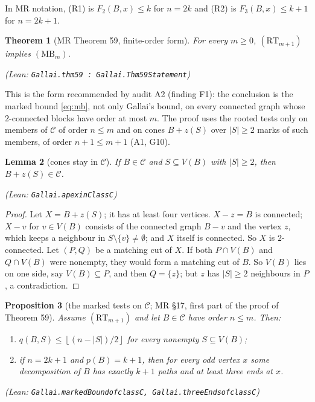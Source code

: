 \documentclass[11pt]{amsart}
\newtheorem{theorem}{Theorem}[section]
\newtheorem{lemma}[theorem]{Lemma}
\newtheorem{proposition}[theorem]{Proposition}
\theoremstyle{definition}
\theoremstyle{remark}
\renewcommand{\_}{\oldunderscore\allowbreak}
\newcommand{\leanst}[1]{\par{\raggedright\small\textup{(Lean: \texttt{#1})}\par}}
\newcommand{\cC}{\mathcal{C}}
\newcommand{\fl}[1]{\left\lfloor #1\right\rfloor}
\newcommand{\MBU}{\mathrm{MB}}
\newcommand{\RT}{\mathrm{RT}}
\begin{document}
In MR notation, (R1) is $F_2(B,x)\le k$ for $n=2k$ and (R2) is $F_3(B,x)\le k+1$ for $n=2k+1$.

\begin{theorem}[MR Theorem 59, finite-order form]\label{thm:59}
For every $m\ge0$, $(\RT_{m+1})$ implies $(\MBU_m)$.
\leanst{Gallai.thm59 : Gallai.Thm59Statement}
\end{theorem}

This is the form recommended by audit A2 (finding F1): the conclusion is the marked bound
\eqref{eq:mb}, not only Gallai's bound, on every connected graph whose $2$-connected blocks have
order at most $m$. The proof uses the rooted tests only on members of $\cC$ of order $n\le m$ and on
cones $B+z(S)$ over $|S|\ge2$ marks of such members, of order $n+1\le m+1$ (A1, G10).

\begin{lemma}[cones stay in $\cC$]\label{lem:coneC}
If $B\in\cC$ and $S\subseteq V(B)$ with $|S|\ge2$, then $B+z(S)\in\cC$.
\leanst{Gallai.apex\_inClassC}
\end{lemma}

\begin{proof}
Let $X=B+z(S)$; it has at least four vertices. $X-z=B$ is connected; $X-v$ for $v\in V(B)$ consists
of the connected graph $B-v$ and the vertex $z$, which keeps a neighbour in $S\setminus\{v\}\ne\emptyset$;
and $X$ itself is connected. So $X$ is $2$-connected. Let $(P,Q)$ be a matching cut of $X$. If both
$P\cap V(B)$ and $Q\cap V(B)$ were nonempty, they would form a matching cut of $B$. So $V(B)$ lies
on one side, say $V(B)\subseteq P$, and then $Q=\{z\}$; but $z$ has $|S|\ge2$ neighbours in $P$, a
contradiction.
\end{proof}

\begin{proposition}[the marked tests on $\cC$; MR \S17, first part of the proof of Theorem 59]
\label{prop:classC}
Assume $(\RT_{m+1})$ and let $B\in\cC$ have order $n\le m$. Then:
\begin{enumerate}[label=\textup{(\alph*)}]
\item $q(B,S)\le\fl{(n-|S|)/2}$ for every nonempty $S\subseteq V(B)$;
\item if $n=2k+1$ and $p(B)=k+1$, then for every odd vertex $x$ some decomposition of $B$ has exactly
$k+1$ paths and at least three ends at $x$.
\end{enumerate}
\leanst{Gallai.markedBound\_of\_classC, Gallai.threeEnds\_of\_classC}
\end{proposition}
\end{document}
